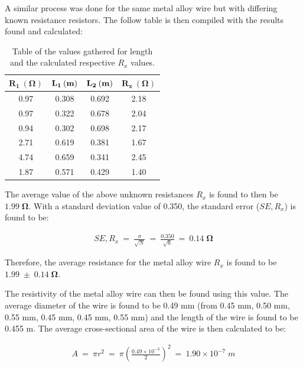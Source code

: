 \documentclass[12pt]{article}
\begin{document}
A similar process was done for the same metal alloy wire but with differing known resistance resistors. The follow table is then compiled with the results found and calculated:

\begin{table}[H]
    \centering
    \caption{Table of the values gathered for length and the calculated respective $R_x$ values.}
    \label{tab:1}
    \begin{tabular}{cccc}
    \hline
    $\mathbf{R_1 \: (\Omega)}$ & $\mathbf{L_1 \: (\text{\textbf{m}})}$ & $\mathbf{L_2 \: (\text{\textbf{m}})}$ & $\mathbf{R_x \: (\Omega)}$ \\ \hline \hline
    \rowcolor[HTML]{EFEFEF} 
    0.97 & 0.308 & 0.692 & 2.18 \\
    \rowcolor[HTML]{EFEFEF} 
    0.97 & 0.322 & 0.678 & 2.04 \\
    0.94 & 0.302 & 0.698 & 2.17 \\
    2.71 & 0.619 & 0.381 & 1.67 \\
    4.74 & 0.659 & 0.341 & 2.45 \\
    1.87 & 0.571 & 0.429 & 1.40 \\ \hline
    \end{tabular}%
\end{table}

The average value of the above unknown resistances $R_x$ is found to then be $\mathbf{1.99 \; \Omega}$. With a standard deviation value of 0.350, the standard error ($SE,R_x$) is found to be:

\vspace{-2ex}
\begin{gather*}
    SE,R_x \: = \: \frac{\sigma}{\sqrt{N}} \: = \: \frac{0.350}{\sqrt{6}} \: = \: \mathbf{0.14 \; \Omega}
\end{gather*}

Therefore, the average resistance for the metal alloy wire $R_x$ is found to be $\mathbf{1.99 \; \pm \; 0.14 \; \Omega}$.

The resistivity of the metal alloy wire can then be found using this value. The average diameter of the wire is found to be 0.49 mm (from 0.45 mm, 0.50 mm, 0.55 mm, 0.45 mm, 0.45 mm, 0.55 mm) and the
length of the wire is found to be 0.455 m. The average cross-sectional area of the wire is then calculated to be:

\vspace{-2ex}
\begin{gather*}
    A \: = \: \pi r^2 \: = \: \pi \left( \frac{0.49 \times 10^{-3}}{2} \right)^2 \: = \: 1.90 \times 10 ^{-7} \; m
\end{gather*}
\end{document}
